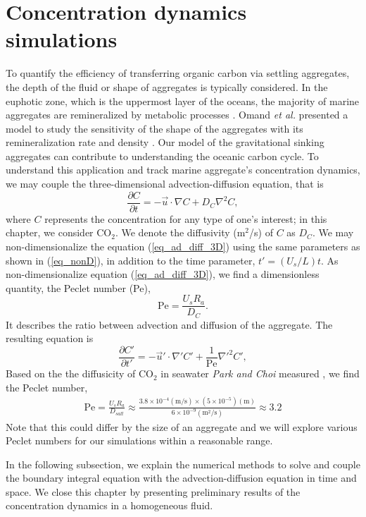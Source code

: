 \section{Concentration dynamics simulations}
\label{sec:concentration}
To quantify the efficiency of transferring organic carbon via settling aggregates, the depth of the fluid or shape of aggregates is typically considered.
In the euphotic zone, which is the uppermost layer of the oceans, the majority of marine aggregates are remineralized by metabolic processes \cite{henson_global_2012}. Omand {\it{et al.}} presented a model to study the sensitivity of the shape of the aggregates with its remineralization rate and density \cite{omand_sinking_2020}. 
Our model of the gravitational sinking aggregates can contribute to understanding the oceanic carbon cycle. 
To understand this application and track marine aggregate's concentration dynamics, we may couple the three-dimensional advection-diffusion equation, that is 
\begin{equation}
	\frac{\partial C }{\partial t} 
	= - \vec{u} \cdot \nabla C
	+ D_{C} \nabla^2 C,
	\label{eq_ad_diff_3D}
\end{equation} 
where $C$ represents the concentration for any type of one's interest; in this chapter, we consider CO$_2$. 
We denote the diffusivity (m$^2$/s) of $C$ as $D_{C}$.
We may non-dimensionalize the equation (\ref{eq_ad_diff_3D}) using the same parameters as shown in (\ref{eq_nonD}), in addition to the time parameter, $t' = \left(U_s/L \right) t$. 
As non-dimensionalize equation (\ref{eq_ad_diff_3D}), 
 we find a dimensionless quantity, the Peclet number (Pe), 
 \[
\text{Pe} = \frac{U_s R_a}{D_C}.	
 \]
 It describes the ratio between advection and diffusion of the aggregate.  
 The resulting equation is
\begin{equation}
	\frac{\partial C' }{\partial t'} 
	= - \vec{u}' \cdot \nabla' C'
	+ \frac{1}{\text{Pe}} \nabla'^2 C',
	\label{eq_ad_diff_nonD}
\end{equation}
Based on the the diffusicity of CO$_2$ in seawater \textit{Park and Choi} measured \cite{park_performance_2020}, we find the Peclet number,
\begin{align}
	\text{Pe} 
	= \frac{U_s R_a }{D_{salt}} 
	\approx \frac{3.8 \times 10^{-4}(\text{m/s}) \times \left(5 \times 10^{-5} \right) (\text{m})}{6 \times 10^{-9} (\text{m}^2\text{/s})} \approx 3.2
\end{align}
Note that this could differ by the size of an aggregate and we will explore various Peclet numbers for our simulations within a reasonable range. 
\par 
In the following subsection, we explain the numerical methods to solve and couple the boundary integral equation with the advection-diffusion equation in time and space. We close this chapter by presenting preliminary results of the concentration dynamics in a homogeneous fluid. 
